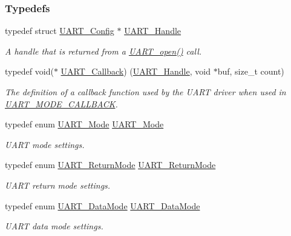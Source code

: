 \subsubsection*{Typedefs}
\begin{DoxyCompactItemize}
\item 
typedef struct \hyperlink{struct_u_a_r_t___config}{U\+A\+R\+T\+\_\+\+Config} $\ast$ \hyperlink{_u_a_r_t_8h_a13cc669fae768d8212e6491ce71b28af}{U\+A\+R\+T\+\_\+\+Handle}
\begin{DoxyCompactList}\small\item\em A handle that is returned from a \hyperlink{_u_a_r_t_8h_a0442ea1ec23901168da31726bb3254c1}{U\+A\+R\+T\+\_\+open()} call. \end{DoxyCompactList}\item 
typedef void($\ast$ \hyperlink{_u_a_r_t_8h_a44620a9d91e0357ebc6f0a79984d9e1e}{U\+A\+R\+T\+\_\+\+Callback}) (\hyperlink{_u_a_r_t_8h_a13cc669fae768d8212e6491ce71b28af}{U\+A\+R\+T\+\_\+\+Handle}, void $\ast$buf, size\+\_\+t count)
\begin{DoxyCompactList}\small\item\em The definition of a callback function used by the U\+A\+R\+T driver when used in \hyperlink{_u_a_r_t_8h_a2507a620dba95cd20885c52494d19e90ae0dbd9b5195e56c3c2aed10163523754}{U\+A\+R\+T\+\_\+\+M\+O\+D\+E\+\_\+\+C\+A\+L\+L\+B\+A\+C\+K}. \end{DoxyCompactList}\item 
typedef enum \hyperlink{_u_a_r_t_8h_a2507a620dba95cd20885c52494d19e90}{U\+A\+R\+T\+\_\+\+Mode} \hyperlink{_u_a_r_t_8h_a247ea9ec7b19a8e46dab1ac86b3eb0a7}{U\+A\+R\+T\+\_\+\+Mode}
\begin{DoxyCompactList}\small\item\em U\+A\+R\+T mode settings. \end{DoxyCompactList}\item 
typedef enum \hyperlink{_u_a_r_t_8h_acb5a82843435a1b5d51b6c27028d914f}{U\+A\+R\+T\+\_\+\+Return\+Mode} \hyperlink{_u_a_r_t_8h_a5fe0b5a28881f05c198e4226536cf62b}{U\+A\+R\+T\+\_\+\+Return\+Mode}
\begin{DoxyCompactList}\small\item\em U\+A\+R\+T return mode settings. \end{DoxyCompactList}\item 
typedef enum \hyperlink{_u_a_r_t_8h_a694090fdb166f94ac30b809f9cba87b8}{U\+A\+R\+T\+\_\+\+Data\+Mode} \hyperlink{_u_a_r_t_8h_a5d5d37ac84acc0ea543ef3737460d41a}{U\+A\+R\+T\+\_\+\+Data\+Mode}
\begin{DoxyCompactList}\small\item\em U\+A\+R\+T data mode settings. \end{DoxyCompactList}\item 

\end{DoxyCompactItemize}
